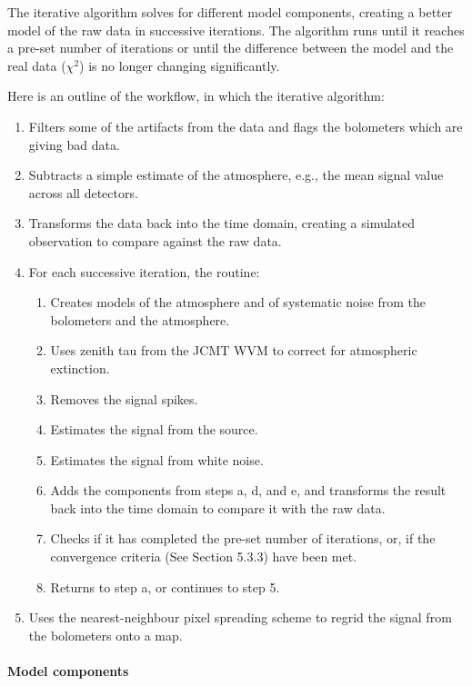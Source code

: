 \documentclass[twoside,11pt]{article}
\renewcommand{\_}{\texttt{\symbol{95}}}
\begin{document}
The iterative algorithm solves for different model components,
creating a better model of the raw data in successive iterations. The
algorithm runs until it reaches a pre-set number of iterations or
until the difference between the model and the real data ($\chi^2$) is
no longer changing significantly.

Here is an outline of the workflow, in which the iterative algorithm:
\begin{enumerate}
\item Filters some of the artifacts from the data and flags the
  bolometers which are giving bad data.
\item Subtracts a simple estimate of the atmosphere, e.g., the mean
  signal value across all detectors.
\item Transforms the data back into the time domain, creating a
  simulated observation to compare against the raw data.
\item For each successive iteration, the routine:
  \begin{enumerate}
    \item Creates models of the atmosphere and of systematic noise
      from the bolometers and the atmosphere.
    \item Uses zenith tau from the JCMT WVM to correct for atmospheric
      extinction.
    \item Removes the signal spikes.
    \item Estimates the signal from the source.
    \item Estimates the signal from white noise.
    \item Adds the components from steps a, d, and e, and transforms
      the result back into the time domain to compare it with the raw
      data.
    \item Checks if it has completed the pre-set number of iterations,
      or, if the convergence criteria (See Section 5.3.3) have been
      met.
    \item Returns to step a, or continues to step 5.
  \end{enumerate}
\item Uses the nearest-neighbour pixel spreading scheme to regrid the
  signal from the bolometers onto a map.
\end{enumerate}

\paragraph{Model components}
\end{document}
